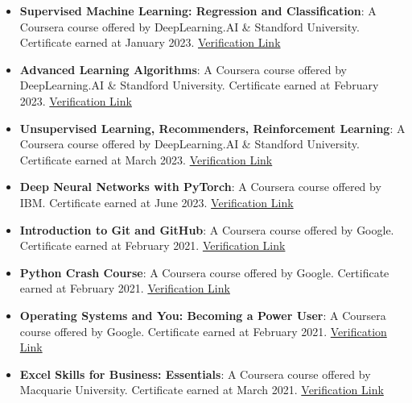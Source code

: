 \documentclass[letterpaper, 12pt]{article}
\begin{document}
\begin{itemize}[leftmargin=*]

	\item \textbf{Supervised Machine Learning: Regression and Classification}: A Coursera course offered
	      by DeepLearning.AI \& Standford University. Certificate earned at January 2023.
	      \href{https://www.coursera.org/account/accomplishments/certificate/VD8VT99H89J5}{Verification Link}

	\item \textbf{Advanced Learning Algorithms}: A  Coursera course offered by DeepLearning.AI \&
	      Standford University. Certificate earned at February 2023.
	      \href{https://www.coursera.org/account/accomplishments/certificate/7PRNGGJZ7YBR}{Verification Link}

	\item \textbf{Unsupervised Learning, Recommenders, Reinforcement Learning}: A Coursera course
	      offered by DeepLearning.AI \& Standford University. Certificate earned at March 2023.
	      \href{https://www.coursera.org/account/accomplishments/certificate/CTH6L4SBUL7S}{Verification Link}

	\item \textbf{Deep Neural Networks with PyTorch}: A Coursera course offered by IBM. Certificate
	      earned at June 2023.
	      \href{https://www.coursera.org/account/accomplishments/certificate/VW9E3WQXYPJ9}{Verification Link}

	\item \textbf{Introduction to Git and GitHub}: A Coursera course offered by Google. Certificate
	      earned at February 2021.
	      \href{https://www.coursera.org/account/accomplishments/certificate/3H3N24N688CQ}{Verification Link}

	\item \textbf{Python Crash Course}: A Coursera course offered by Google. Certificate earned at February 2021.
	      \href{https://www.coursera.org/account/accomplishments/certificate/ULTQVPQLDMZU}{Verification Link}

	\item \textbf{Operating Systems and You: Becoming a Power User}: A Coursera course offered by Google.
	      Certificate earned at February 2021.
	      \href{https://www.coursera.org/account/accomplishments/certificate/3N5CTQHU47X3}{Verification Link}

	\item \textbf{Excel Skills for Business: Essentials}: A Coursera course offered by Macquarie University.
	      Certificate earned at March 2021.
	      \href{https://www.coursera.org/account/accomplishments/certificate/7DPNK2A4CHMX}{Verification Link}

\end{itemize}
\end{document}
